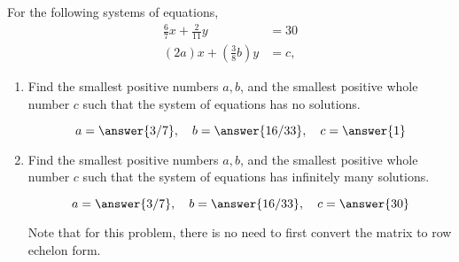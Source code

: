 \documentclass{ximera}
\author{Parisa Fatheddin}
\begin{document}
\begin{exercise}
For the following systems of equations,
\begin{align*}
\frac{6}{7} x + \frac{2}{11}y &= 30\\
(2a) x + \left(\frac{3}{8} b\right) y &= c,
\end{align*}
\begin{enumerate}
\item Find the smallest positive numbers $a,b$, and the smallest positive
  whole number $c$ such that the system of equations has no solutions.
\begin{prompt}
  \[
  a= \answer{3/7}, \quad b= \answer{16/33}, \quad c=\answer{1}
  \]
 \end{prompt}

\item Find the smallest positive numbers $a,b$, and the smallest positive
  whole number $c$ such that the system of equations has infinitely
  many solutions.
\begin{prompt}
  \[
  a= \answer{3/7}, \quad b= \answer{16/33}, \quad c = \answer{30}
  \]
\end{prompt}
\begin{hint}
 Note that for this problem, there is no need to first convert the matrix to row echelon form.
\end{hint}
\end{enumerate}
\end{exercise}
\end{document}
